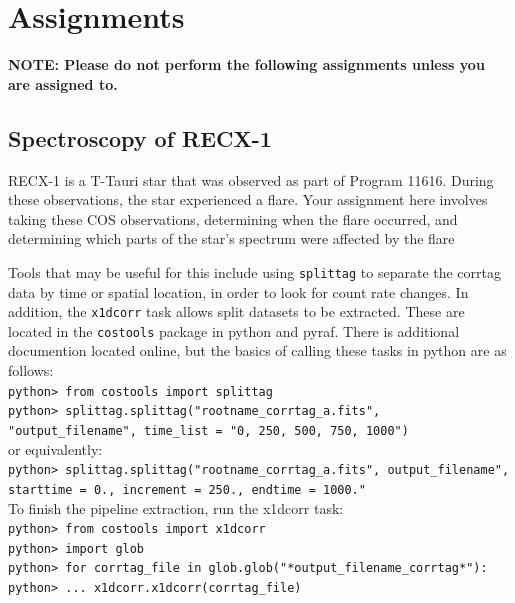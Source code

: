 \chapter{Assignments}
\label{ch:assignments}

{\bf NOTE: Please do not perform the following assignments unless you are assigned to.}

\section{Spectroscopy of RECX-1}

RECX-1 is a T-Tauri star that was observed as part of Program 11616. During these observations, the star experienced a flare. Your assignment here involves taking these COS observations, determining when the flare occurred, and determining which parts of the star's spectrum were affected by the flare

Tools that may be useful for this include using \texttt{splittag} to separate the corrtag data by time or spatial location, in order to look for count rate changes. In addition, the \texttt{x1dcorr} task allows split datasets to be extracted. These are located in the \texttt{costools} package in python and pyraf. There is additional documention located online, but the basics of calling these tasks in python are as follows: \\

\texttt{python> from costools import splittag \\
python> splittag.splittag("rootname\_corrtag\_a.fits", "output\_filename", time\_list = "0, 250, 500, 750, 1000")} \\
or equivalently: \\
\texttt{python> splittag.splittag("rootname\_corrtag\_a.fits", output\_filename", starttime = 0., increment = 250., endtime = 1000."} \\

To finish the pipeline extraction, run the x1dcorr task: \\

\texttt{python> from costools import x1dcorr\\
python> import glob\\
python> for corrtag\_file in glob.glob("*output\_filename\_corrtag*"): \\
python> ... x1dcorr.x1dcorr(corrtag\_file)} 

